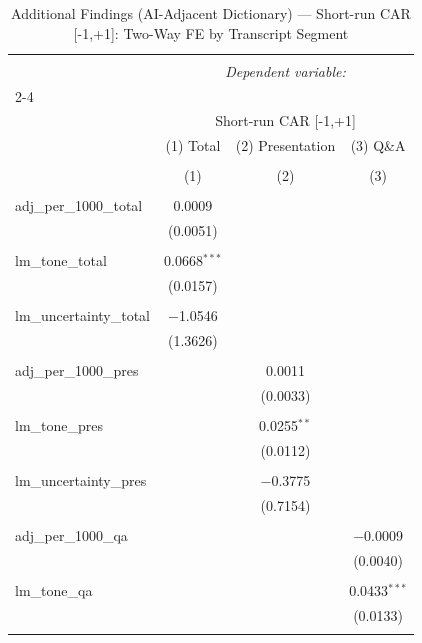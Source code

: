 
\begin{table}[!htbp] \centering 
  \caption{Additional Findings (AI-Adjacent Dictionary) — Short-run CAR [-1,+1]: Two-Way FE by Transcript Segment} 
  \label{} 
\begin{tabular}{@{\extracolsep{5pt}}lccc} 
\\[-1.8ex]\hline 
\hline \\[-1.8ex] 
 & \multicolumn{3}{c}{\textit{Dependent variable:}} \\ 
\cline{2-4} 
\\[-1.8ex] & \multicolumn{3}{c}{Short-run CAR [-1,+1]} \\ 
 & (1) Total & (2) Presentation & (3) Q\&A \\ 
\\[-1.8ex] & (1) & (2) & (3)\\ 
\hline \\[-1.8ex] 
 adj\_per\_1000\_total & 0.0009 &  &  \\ 
  & (0.0051) &  &  \\ 
  & & & \\ 
 lm\_tone\_total & 0.0668$^{***}$ &  &  \\ 
  & (0.0157) &  &  \\ 
  & & & \\ 
 lm\_uncertainty\_total & $-$1.0546 &  &  \\ 
  & (1.3626) &  &  \\ 
  & & & \\ 
 adj\_per\_1000\_pres &  & 0.0011 &  \\ 
  &  & (0.0033) &  \\ 
  & & & \\ 
 lm\_tone\_pres &  & 0.0255$^{**}$ &  \\ 
  &  & (0.0112) &  \\ 
  & & & \\ 
 lm\_uncertainty\_pres &  & $-$0.3775 &  \\ 
  &  & (0.7154) &  \\ 
  & & & \\ 
 adj\_per\_1000\_qa &  &  & $-$0.0009 \\ 
  &  &  & (0.0040) \\ 
  & & & \\ 
 lm\_tone\_qa &  &  & 0.0433$^{***}$ \\ 
  &  &  & (0.0133) \\ 
  & & & \\ 

\end{tabular}
\end{table}
